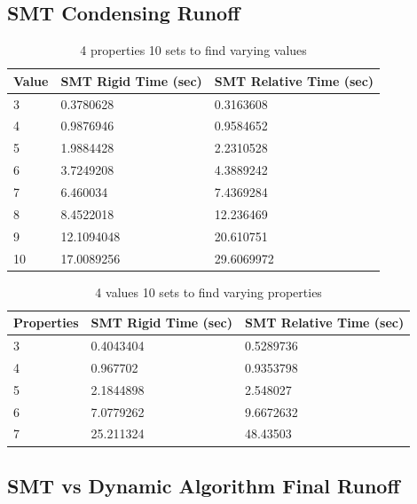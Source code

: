 \documentclass[pageno]{jpaper}
\begin{document}
\subsection{SMT Condensing Runoff}



\begin{table}[htbp]
  \centering
  \begin{tabular}{|l   |l   |l | } \hline
    \textbf{Value} & \textbf{SMT Rigid Time (sec)}  & \textbf{SMT Relative Time (sec)} \\\hline
3 & 0.3780628 & 0.3163608 \\ \hline
4 & 0.9876946 & 0.9584652 \\ \hline
5 & 1.9884428 & 2.2310528 \\ \hline
6 & 3.7249208 & 4.3889242 \\ \hline
7 & 6.460034 & 7.4369284 \\ \hline
8 & 8.4522018 & 12.236469 \\ \hline
9 & 12.1094048 & 20.610751 \\ \hline
10 & 17.0089256 & 29.6069972 \\ \hline
  \end{tabular}
  \caption{4 properties 10 sets to find varying values}
  \label{table:RunoffValTable}
\end{table}

\begin{table}[htbp]
  \centering
  \begin{tabular}{|l   |l   |l | } \hline
    \textbf{Properties} & \textbf{SMT Rigid Time (sec)}  & \textbf{SMT Relative Time (sec)} \\\hline
3 & 0.4043404 & 0.5289736 \\ \hline
4 & 0.967702 & 0.9353798 \\ \hline
5 & 2.1844898 & 2.548027 \\ \hline
6 & 7.0779262 & 9.6672632 \\ \hline
7 & 25.211324 & 48.43503 \\ \hline
  \end{tabular}
  \caption{4 values 10 sets to find varying properties}
  \label{table:RunoffPropTable}
\end{table}


\subsection{SMT vs Dynamic Algorithm Final Runoff}
\end{document}
